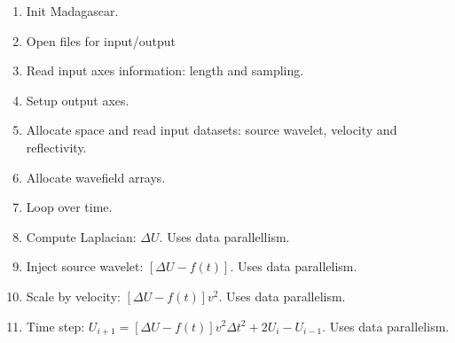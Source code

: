 \tiny

\normalsize
\newpage

\begin{enumerate}
\item Init Madagascar.
\tiny

\normalsize

\item Open files for input/output
\tiny

\normalsize

\item Read input axes information: length and sampling.
\tiny

\normalsize

\item Setup output axes.
\tiny

\normalsize

\item Allocate space and read input datasets: source wavelet, 
	velocity and reflectivity.
\tiny

\normalsize

\item Allocate wavefield arrays.
\tiny

\normalsize

\item Loop over time.
\tiny

\normalsize

\item Compute Laplacian: $\Delta U$. Uses data parallellism.
\tiny

\normalsize

\item Inject source wavelet: $\left[ \Delta U - f(t) \right]$. 
	Uses data parallelism.
\tiny

\normalsize

\item Scale by velocity: $\left[ \Delta U - f(t) \right] v^2$. Uses
	data parallelism.
\tiny

\normalsize

\item Time step:
$U_{i+1} = \left[ \Delta U -f(t) \right] v^2 \Delta t^2 + 2 U_{i} - U_{i-1}$.
Uses data parallelism.
\tiny

\normalsize


\end{enumerate}
